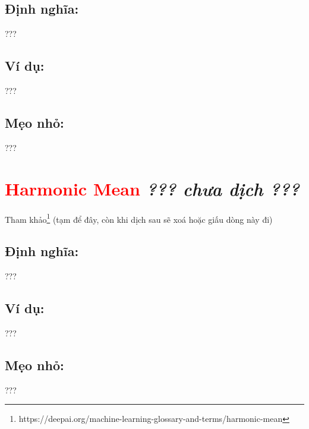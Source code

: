 \subsection*{Định nghĩa:}
???
\subsection*{Ví dụ:}
???
\subsection*{Mẹo nhỏ:}
???
\section*{\huge \textcolor{Red}{Harmonic Mean}  \small \textit{??? chưa dịch ???} }
Tham khảo\footnote{https://deepai.org/machine-learning-glossary-and-terms/harmonic-mean} (tạm để đây, còn khi dịch sau sẽ xoá hoặc giấu dòng này đi)
\subsection*{Định nghĩa:}
???
\subsection*{Ví dụ:}
???
\subsection*{Mẹo nhỏ:}
???
